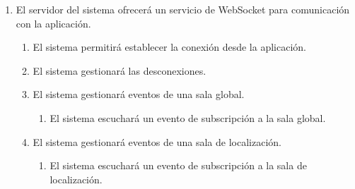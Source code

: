 \begin{enumerate}[label*=RI\arabic*.]
\begin{enumerate}[label*=\arabic*.]
\begin{enumerate}[label*=\arabic*.]
            \item La \acrshort{api} ofrecerá un \gls{endpoint} para marcar una tarea como completada.
            \item La \acrshort{api} ofrecerá un \gls{endpoint} para marcar una tarea como no completada.
        \end{enumerate}
        \item La \acrshort{api} ofrecerá \glspl{endpoint} para la gestión de mensajes. 
        \begin{enumerate}[label*=\arabic*.]
            \item La \acrshort{api} ofrecerá un \gls{endpoint} para recuperar los mensajes más recientes.
        \end{enumerate}
        \item La \acrshort{api} ofrecerá \glspl{endpoint} para la gestión de notificaciones. 
        \begin{enumerate}[label*=\arabic*.]
            \item La \acrshort{api} ofrecerá un \gls{endpoint} para recuperar las notificaciones no leídas.
            \item La \acrshort{api} ofrecerá un \gls{endpoint} para marcar una notificación como leída.
            \item La \acrshort{api} ofrecerá un \gls{endpoint} para marcar todas las notificaciones como leídas.
        \end{enumerate}
    \end{enumerate}
    \item El servidor del sistema ofrecerá un servicio de WebSocket para comunicación con la aplicación.
    \begin{enumerate}[label*=\arabic*.]
        \item El sistema permitirá establecer la conexión desde la aplicación.
        \item El sistema gestionará las desconexiones.
        \item El sistema gestionará eventos de una sala global.
        \begin{enumerate}[label*=\arabic*.]
            \item El sistema escuchará un evento de subscripción a la sala global.
        \end{enumerate}
        \item El sistema gestionará eventos de una sala de localización.
        \begin{enumerate}[label*=\arabic*.]
            \item El sistema escuchará un evento de subscripción a la sala de localización.

\end{enumerate}
\end{enumerate}
\end{enumerate}
